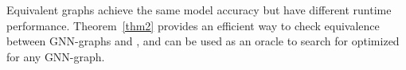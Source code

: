 
Equivalent graphs achieve the same model accuracy but have different runtime performance. 
Theorem~\ref{thm2} provides an efficient way to check equivalence between GNN-graphs and \xgs, and can be used as an oracle to search for optimized \xgs for any GNN-graph.
